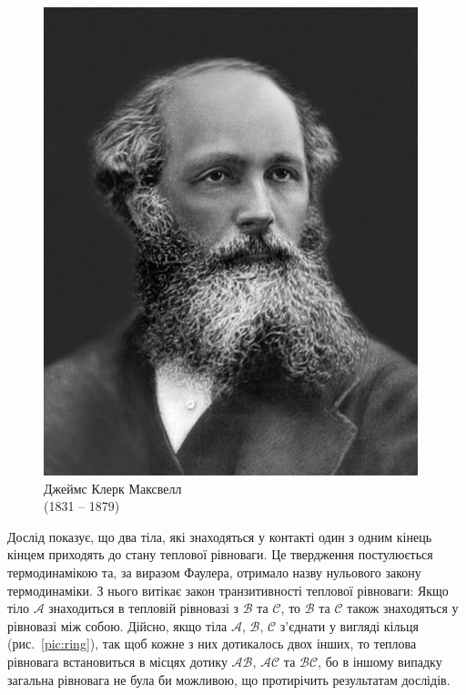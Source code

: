 \setlength\parfillskip{0pt}\par\setlength{}
\begin{figure}
\includegraphics[width=\linewidth]{Lec1/Maxwell}
\caption*{Джеймс Клерк Максвелл\\(1831 -- 1879)}
\end{figure}
Дослід показує, що два тіла, які знаходяться у контакті один з одним кінець кінцем приходять до стану теплової рівноваги. Це твердження постулюється термодинамікою та, за виразом Фаулера, отримало назву нульового закону термодинаміки. З нього витікає закон транзитивності теплової рівноваги: Якщо тіло $\mathcal{A}$ знаходиться в тепловій рівновазі з $\mathcal{B}$ та $\mathcal{C}$, то $\mathcal{B}$ та $\mathcal{C}$ також знаходяться у рівновазі між собою. Дійсно, якщо тіла $\mathcal{A}$, $\mathcal{B}$, $\mathcal{C}$ з'єднати у вигляді кільця (рис.~\ref{pic:ring}), так щоб кожне з них дотикалось двох інших, то теплова рівновага встановиться в місцях дотику $\mathcal{AB}$, $\mathcal{AC}$ та $\mathcal{BC}$, бо в іншому випадку загальна рівновага не була би можливою, що протирічить результатам дослідів.

